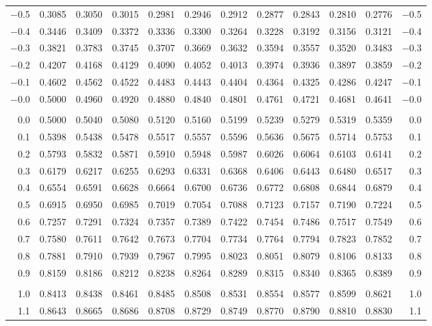 \documentclass[12pt]{article}
\begin{document}
\begin{landscape}
\begin{adjustbox}{angle=270}
\begin{tabular}{
	r
	@{\hspace{4.5mm}}
	*{5}{c @{\hspace{2.5mm}}} 
	@{\hspace{-0.5mm}}
	*{5}{@{\hspace{2.5mm}} c} 
	@{\hspace{2mm}}
	r
	}
$-$0.5 & 0.3085 & 0.3050 & 0.3015 & 0.2981 & 0.2946 & 0.2912 & 0.2877 & 0.2843 & 0.2810 & 0.2776 & $-$0.5 \\
$-$0.4 & 0.3446 & 0.3409 & 0.3372 & 0.3336 & 0.3300 & 0.3264 & 0.3228 & 0.3192 & 0.3156 & 0.3121 & $-$0.4 \\
$-$0.3 & 0.3821 & 0.3783 & 0.3745 & 0.3707 & 0.3669 & 0.3632 & 0.3594 & 0.3557 & 0.3520 & 0.3483 & $-$0.3 \\
$-$0.2 & 0.4207 & 0.4168 & 0.4129 & 0.4090 & 0.4052 & 0.4013 & 0.3974 & 0.3936 & 0.3897 & 0.3859 & $-$0.2 \\
$-$0.1 & 0.4602 & 0.4562 & 0.4522 & 0.4483 & 0.4443 & 0.4404 & 0.4364 & 0.4325 & 0.4286 & 0.4247 & $-$0.1 \\
$-$0.0 & 0.5000 & 0.4960 & 0.4920 & 0.4880 & 0.4840 & 0.4801 & 0.4761 & 0.4721 & 0.4681 & 0.4641 & $-$0.0 \\
&&&&&&&&&&{} \\
0.0 & 0.5000 & 0.5040 & 0.5080 & 0.5120 & 0.5160 & 0.5199 & 0.5239 & 0.5279 & 0.5319 & 0.5359 & 0.0 \\
0.1 & 0.5398 & 0.5438 & 0.5478 & 0.5517 & 0.5557 & 0.5596 & 0.5636 & 0.5675 & 0.5714 & 0.5753 & 0.1 \\
0.2 & 0.5793 & 0.5832 & 0.5871 & 0.5910 & 0.5948 & 0.5987 & 0.6026 & 0.6064 & 0.6103 & 0.6141 & 0.2 \\
0.3 & 0.6179 & 0.6217 & 0.6255 & 0.6293 & 0.6331 & 0.6368 & 0.6406 & 0.6443 & 0.6480 & 0.6517 & 0.3 \\
0.4 & 0.6554 & 0.6591 & 0.6628 & 0.6664 & 0.6700 & 0.6736 & 0.6772 & 0.6808 & 0.6844 & 0.6879 & 0.4 \\
0.5 & 0.6915 & 0.6950 & 0.6985 & 0.7019 & 0.7054 & 0.7088 & 0.7123 & 0.7157 & 0.7190 & 0.7224 & 0.5 \\
0.6 & 0.7257 & 0.7291 & 0.7324 & 0.7357 & 0.7389 & 0.7422 & 0.7454 & 0.7486 & 0.7517 & 0.7549 & 0.6 \\
0.7 & 0.7580 & 0.7611 & 0.7642 & 0.7673 & 0.7704 & 0.7734 & 0.7764 & 0.7794 & 0.7823 & 0.7852 & 0.7 \\
0.8 & 0.7881 & 0.7910 & 0.7939 & 0.7967 & 0.7995 & 0.8023 & 0.8051 & 0.8079 & 0.8106 & 0.8133 & 0.8 \\
0.9 & 0.8159 & 0.8186 & 0.8212 & 0.8238 & 0.8264 & 0.8289 & 0.8315 & 0.8340 & 0.8365 & 0.8389 & 0.9 \\
&&&&&&&&&&{} \\
1.0 & 0.8413 & 0.8438 & 0.8461 & 0.8485 & 0.8508 & 0.8531 & 0.8554 & 0.8577 & 0.8599 & 0.8621 & 1.0 \\
1.1 & 0.8643 & 0.8665 & 0.8686 & 0.8708 & 0.8729 & 0.8749 & 0.8770 & 0.8790 & 0.8810 & 0.8830 & 1.1 \\

\end{tabular}
\end{adjustbox}
\end{landscape}
\end{document}
